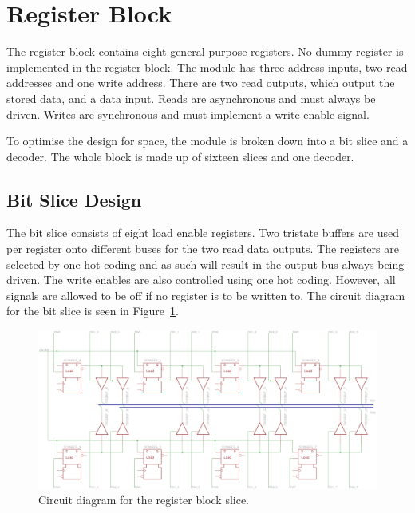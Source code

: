 
\section{Register Block}

The register block contains eight general purpose registers. 
No dummy register is implemented in the register block. 
The module has three address inputs, two read addresses and one write address. 
There are two read outputs, which output the stored data, and a data input. 
Reads are asynchronous and must always be driven. 
Writes are synchronous and must implement a write enable signal. 

To optimise the design for space, the module is broken down into a bit slice and a decoder. 
The whole block is made up of sixteen slices and one decoder. 

\subsection{Bit Slice Design}

The bit slice consists of eight load enable registers. 
Two tristate buffers are used per register onto different buses for the two read data outputs. 
The registers are selected by one hot coding and as such will result in the output bus always being driven. 
The write enables are also controlled using one hot coding. 
However, all signals are allowed to be off if no register is to be written to.
The circuit diagram for the bit slice is seen in Figure~\ref{fig:reg:slice}.

\begin{figure}
\centering
\includegraphics[angle=90,height=\textheight]{../../eagle/regBlock/regBlock_slice.png}
\caption{Circuit diagram for the register block slice.}
\label{fig:reg:slice}
\end{figure}

